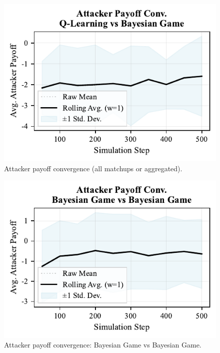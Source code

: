\documentclass[conference]{IEEEtran}
\begin{document}
\begin{figure}[h!]
    \centering
    \includegraphics[width=0.9\linewidth]{figures/appendix/fig_atk_convergence.pdf}
    \caption{Attacker payoff convergence (all matchups or aggregated).}
\end{figure}

\begin{figure}[h!]
    \centering
    \includegraphics[width=0.9\linewidth]{figures/appendix/fig_atk_convergence_Bayesian_Game_vs_Bayesian_Game.pdf}
    \caption{Attacker payoff convergence: Bayesian Game vs Bayesian Game.}
\end{figure}
\end{document}
